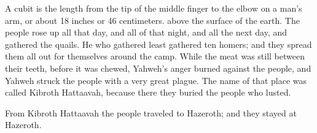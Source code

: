 {{A cubit is the length from the tip of the middle finger to the elbow on a man’s arm, or about 18 inches or 46 centimeters.} above the surface of the earth.
The people rose up all that day, and all of that night, and all the next day, and gathered the quails. He who gathered least gathered ten homers;
 and they spread them all out for themselves around the camp.
While the meat was still between their teeth, before it was chewed, Yahweh’s anger burned against the people, and Yahweh struck the people with a very great plague.
The name of that place was called Kibroth Hattaavah, because there they buried the people who lusted.
\par }{\PP {}From Kibroth Hattaavah the people traveled to Hazeroth; and they stayed at Hazeroth.

}
